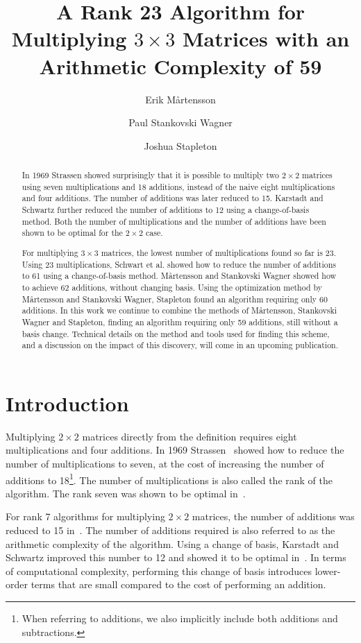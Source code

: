 \documentclass{article}
\title{A Rank 23 Algorithm for Multiplying $3 \times 3$ Matrices with an Arithmetic Complexity of 59}
\author[1,2]{Erik Mårtensson}
\author[1]{Paul Stankovski Wagner}
\author[3]{Joshua Stapleton}
\date{}
\affil[1]{Lund University, Lund, Sweden \texttt{{\small \{erik.martensson,paul.stankovski\_wagner\}@eit.lth.se}}}
\affil[2]{Advenica AB, Malm\"o, Sweden}
\affil[3]{Department of Mathematics, Imperial College London, UK \texttt{{\small jbs123@ic.ac.uk}}}
\begin{document}
\maketitle

\begin{abstract}
In 1969 Strassen showed surprisingly that it is possible to multiply two $2 \times 2$ matrices using seven multiplications and 18 additions, instead of the naive eight multiplications and four additions. The number of additions was later reduced to 15. Karstadt and Schwartz further reduced the number of additions to 12 using a change-of-basis method. Both the number of multiplications and the number of additions have been shown to be optimal for the $2 \times 2$ case.

For multiplying $3 \times 3$ matrices, the lowest number of multiplications found so far is 23. Using 23 multiplications, Schwart et al. showed how to reduce the number of additions to 61 using a change-of-basis method. Mårtensson and Stankovski Wagner showed how to achieve 62 additions, without changing basis. Using the optimization method by Mårtensson and Stankovski Wagner, Stapleton found an algorithm requiring only 60 additions. In this work we continue to combine the methods of Mårtensson, Stankovski Wagner and Stapleton, finding an algorithm requiring only 59 additions, still without a basis change. Technical details on the method and tools used for finding this scheme, and a discussion on the impact of this discovery, will come in an upcoming publication.
\end{abstract}


\section{Introduction}
Multiplying $2 \times 2$ matrices directly from the definition requires eight multiplications and four additions. In 1969 Strassen~\cite{Strassen} showed how to reduce the number of multiplications to seven, at the cost of increasing the number of additions to 18\footnote{When referring to additions, we also implicitly include both additions and subtractions.}. The number of multiplications is also called the rank of the algorithm. The rank seven was shown to be optimal in~\cite{Winograd}.

For rank 7 algorithms for multiplying $2 \times 2$ matrices, the number of additions was reduced to 15 in~\cite{15Optimal}. The number of additions required is also referred to as the arithmetic complexity of the algorithm. Using a change of basis, Karstadt and Schwartz improved this number to 12 and showed it to be optimal in~\cite{KarstadtSchwartz}. In terms of computational complexity, performing this change of basis introduces lower-order terms that are small compared to the cost of performing an addition.
\end{document}
